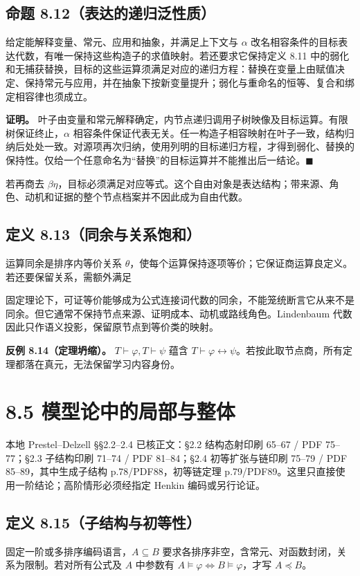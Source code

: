 \documentclass[UTF8,a4paper,zihao=-4,fontset=windows,openany]{ctexbook}
\newcommand{\mcsdisplay}[1]{%
  \par\addvspace{0.7em}%
  \sbox{\mcsmathbox}{\ensuremath{\displaystyle #1}}%
  \ifdim\wd\mcsmathbox>\linewidth
    \noindent\resizebox{\linewidth}{!}{\usebox{\mcsmathbox}}%
  \else
    \noindent\hspace*{\fill}\usebox{\mcsmathbox}\hspace*{\fill}%
  \fi
  \par\addvspace{0.7em}%
}
\def\ensuremath#1{#1}%
\begin{document}
\subsection{命题 8.12（表达的递归泛性质）}
给定能解释变量、常元、应用和抽象，并满足上下文与 \(\alpha\) 改名相容条件的目标表达代数，有唯一保持这些构造子的求值映射。若还要求它保持定义 8.11 中的弱化和无捕获替换，目标的这些运算须满足对应的递归方程：替换在变量上由赋值决定、保持常元与应用，并在抽象下按新变量提升；弱化与重命名的恒等、复合和绑定相容律也须成立。

\textbf{证明。} 叶子由变量和常元解释确定，内节点递归调用子树映像及目标运算。有限树保证终止，\(\alpha\) 相容条件保证代表无关。任一构造子相容映射在叶子一致，结构归纳后处处一致。对源项再次归纳，使用列明的目标递归方程，才得到弱化、替换的保持性。仅给一个任意命名为“替换”的目标运算并不能推出后一结论。\(\blacksquare\)

若再商去 \(\beta\eta\)，目标必须满足对应等式。这个自由对象是表达结构；带来源、角色、动机和证据的整个节点档案并不因此成为自由代数。

\subsection{定义 8.13（同余与关系饱和）}
运算同余是排序内等价关系 \(\theta\)，使每个运算保持逐项等价；它保证商运算良定义。若还要保留关系，需额外满足


\mcsdisplay{x_i\theta y_i\;(1\le i\le k)\Rightarrow
[R(x_1,\ldots,x_k)\leftrightarrow R(y_1,\ldots,y_k)].}
\noindent 固定理论下，可证等价能够成为公式连接词代数的同余，不能笼统断言它从来不是同余。但它通常不保持节点来源、证明成本、动机或路线角色。Lindenbaum 代数因此只作语义投影，保留原节点到等价类的映射。

\textbf{反例 8.14（定理坍缩）。} \(T\vdash\varphi,T\vdash\psi\) 蕴含 \(T\vdash\varphi\leftrightarrow\psi\)。若按此取节点商，所有定理都落在真元，无法保留学习内容身份。

\section{8.5 模型论中的局部与整体}
本地 Prestel–Delzell §§2.2–2.4 已核正文：§2.2 结构态射印刷 65–67 / PDF 75–77；§2.3 子结构印刷 71–74 / PDF 81–84；§2.4 初等扩张与链印刷 75–79 / PDF 85–89，其中生成子结构 p.78/PDF88，初等链定理 p.79/PDF89。这里只直接使用一阶结论；高阶情形必须经指定 Henkin 编码或另行论证。

\subsection{定义 8.15（子结构与初等性）}
固定一阶或多排序编码语言，\(A\subseteq B\) 要求各排序非空，含常元、对函数封闭，关系为限制。若对所有公式及 \(A\) 中参数有 \(A\models\varphi\iff B\models\varphi\)，才写 \(A\preccurlyeq B\)。
\end{document}
